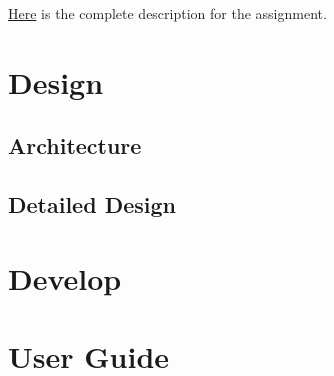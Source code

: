\documentclass[a4paper,12pt]{report}
\begin{document}
    \centerline{\href{https://docs.google.com/document/d/1iFXGmo7RVZMpJ5bxUN5ms_qFqg2B-wecRc0sfas9rQ4/edit?tab=t.0}{Here} is the complete description for the assignment.}

\chapter{Design}

        \section{Architecture}

        \section{Detailed Design}

\chapter{Develop}

\appendix
\chapter{User Guide}
\end{document}
